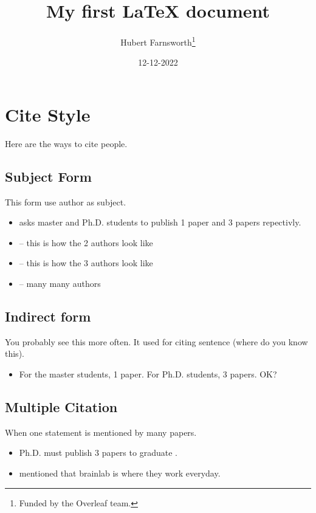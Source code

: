 \documentclass{article}
\title{My first LaTeX document}
\author{Hubert Farnsworth\thanks{Funded by the Overleaf team.}}
\date{12-12-2022}
\begin{document}
\maketitle
\tableofcontents





\section{Cite Style}
Here are the ways to cite people.

\subsection{Subject Form}

This form use author as subject.

\begin{itemize}
    \item \textcite{bcilab} asks master and Ph.D. students to publish 1 paper and 3 papers repectivly.
    \item \textcite{2author} -- this is how the 2 authors look like
    \item \textcite{3author} -- this is how the 3 authors look like
    \item \textcite{vaswani2017attention} -- many many authors
\end{itemize}

\subsection{Indirect form}

You probably see this more often. It used for citing sentence (where do you know this).

\begin{itemize}
    \item For the master students, 1 paper. For  Ph.D. students, 3 papers. OK? \cite{bcilab}
\end{itemize}

\subsection{Multiple Citation}

When one statement is mentioned by many papers.

\begin{itemize}
    \item Ph.D. must publish 3 papers to graduate \cite{bcilab,2author,3author}.
    \item \textcite{2author, 3author} mentioned that brainlab is where they work everyday.
\end{itemize}


\printbibliography %
\end{document}
